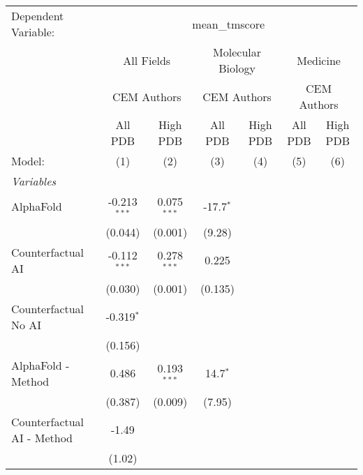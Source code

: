 \begingroup
\centering
\begin{tabular}{lcccccc}
   \tabularnewline \midrule \midrule
   Dependent Variable: & \multicolumn{6}{c}{mean\_tmscore}\\
 & \multicolumn{2}{c}{All Fields} & \multicolumn{2}{c}{Molecular Biology} & \multicolumn{2}{c}{Medicine} \\
\cmidrule(lr){2-3} \cmidrule(lr){4-5} \cmidrule(lr){6-7}
 & \multicolumn{2}{c}{CEM Authors} & \multicolumn{2}{c}{CEM Authors} & \multicolumn{2}{c}{CEM Authors} \\
\cmidrule(lr){2-3} \cmidrule(lr){4-5} \cmidrule(lr){6-7}
 & \multicolumn{1}{c}{All PDB} & \multicolumn{1}{c}{High PDB} & \multicolumn{1}{c}{All PDB} & \multicolumn{1}{c}{High PDB} & \multicolumn{1}{c}{All PDB} & \multicolumn{1}{c}{High PDB} \\
\cmidrule(lr){2-2} \cmidrule(lr){3-3} \cmidrule(lr){4-4} \cmidrule(lr){5-5} \cmidrule(lr){6-6} \cmidrule(lr){7-7}
   Model:                        & (1)            & (2)           & (3)         & (4) & (5) & (6)\\  
   \midrule
   \emph{Variables}\\
   AlphaFold                     & -0.213$^{***}$ & 0.075$^{***}$ & -17.7$^{*}$ &     &     &   \\   
                                 & (0.044)        & (0.001)       & (9.28)      &     &     &   \\   
   Counterfactual AI             & -0.112$^{***}$ & 0.278$^{***}$ & 0.225       &     &     &   \\   
                                 & (0.030)        & (0.001)       & (0.135)     &     &     &   \\   
   Counterfactual No AI          & -0.319$^{*}$   &               &             &     &     &   \\   
                                 & (0.156)        &               &             &     &     &   \\   
   AlphaFold - Method            & 0.486          & 0.193$^{***}$ & 14.7$^{*}$  &     &     &   \\   
                                 & (0.387)        & (0.009)       & (7.95)      &     &     &   \\   
   Counterfactual AI - Method    & -1.49          &               &             &     &     &   \\   
                                 & (1.02)         &               &             &     &     &   \\   

\end{tabular}
